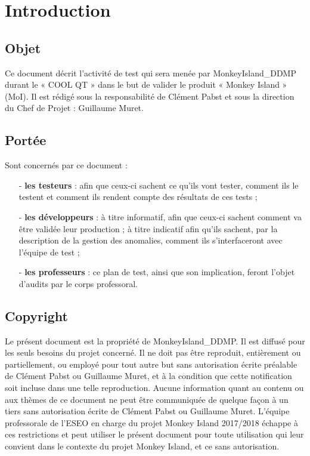 
\chapter{Introduction}

	\section{Objet}

Ce document décrit l'activité de test qui sera menée par MonkeyIsland\_DDMP  durant le « COOL QT » dans le but de valider le produit « Monkey Island » (MoI). Il est rédigé sous la responsabilité de Clément Pabst et sous la direction du Chef de Projet : Guillaume Muret.\\

	\section{Portée}

Sont concernés par ce document :
\begin{itemize}
\item[-] \textbf{les testeurs} : afin que ceux-ci sachent ce qu'ils vont tester, comment ils le testent et comment ils rendent compte des résultats de ces tests ;
\item[-] \textbf{les développeurs} : à titre informatif, afin que ceux-ci sachent comment va être validée leur production ; à titre indicatif afin qu'ils sachent, par la description de la gestion des anomalies, comment ils s'interfaceront avec l'équipe de test ;
\item[-] \textbf{les professeurs} : ce plan de test, ainsi que son implication, feront l'objet d'audits par le corps professoral.\\
 \end{itemize}
 
\newpage 
 
	\section{Copyright}

Le présent document est la propriété de MonkeyIsland\_DDMP. Il est diffusé pour les seuls besoins du projet concerné. Il ne doit pas être reproduit, entièrement ou partiellement, ou employé pour tout autre but sans autorisation écrite préalable de Clément Pabst ou Guillaume Muret, et à la condition que cette notification soit incluse dans une telle reproduction. Aucune information quant au contenu ou aux thèmes de ce document ne peut être communiquée de quelque façon à un tiers sans autorisation écrite de Clément Pabst ou Guillaume Muret.
L’équipe professorale de l'ESEO en charge du projet Monkey Island 2017/2018 échappe à ces restrictions et peut utiliser le présent document pour toute utilisation qui leur convient dans le contexte du projet Monkey Island, et ce sans autorisation.

